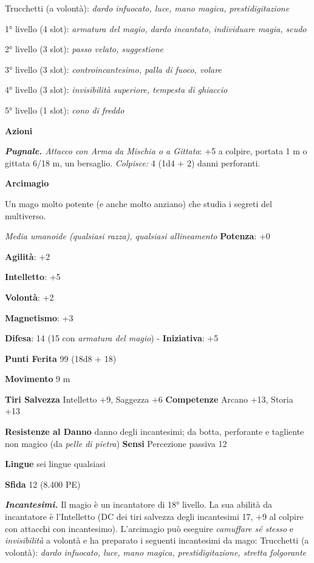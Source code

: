 \begin{multicols}{2}
Trucchetti (a volontà): \emph{dardo infuocato, luce, mano magica,}
\emph{prestidigitazione}

1° livello (4 slot): \emph{armatura del magio, dardo incantato,}
\emph{individuare magia, scudo}

2° livello (3 slot): \emph{passo velato, suggestione}

3° livello (3 slot): \emph{controincantesimo, palla di fuoco, volare}

4° livello (3 slot): \emph{invisibilità superiore, tempesta di ghiaccio}

5° livello (1 slot): \emph{cono di freddo}

\smallskip\textbf{Azioni}

\emph{\textbf{Pugnale.} Attacco con Arma da Mischia o a Gittata}: +5 a
colpire, portata 1 m o gittata 6/18 m, un bersaglio. \emph{Colpisce:}
4 (1d4 + 2) danni perforanti.




\textbf{Arcimagio}

Un mago molto potente (e anche molto anziano) che studia i segreti del
multiverso.

\emph{Media umanoide (qualsiasi razza), qualsiasi allineamento}
\textbf{Potenza}: +0

\textbf{Agilità}: +2

\textbf{Intelletto}: +5

\textbf{Volontà}: +2

\textbf{Magnetismo}: +3

\textbf{Difesa}: 14 (15 con \emph{armatura del magio}) - \textbf{Iniziativa}: +5

\textbf{Punti Ferita} 99 (18d8 + 18)

\textbf{Movimento} 9 m

\textbf{Tiri Salvezza} Intelletto +9, Saggezza +6 \textbf{Competenze}
Arcano +13, Storia +13

\textbf{Resistenze al Danno} danno degli incantesimi; da botta,
perforante e tagliente non magico (da \emph{pelle di pietra})
\textbf{Sensi} Percezione passiva 12

\textbf{Lingue} sei lingue qualsiasi

\textbf{Sfida} 12 (8.400 PE)\smallskip

\emph{\textbf{Incantesimi.}} Il magio è un incantatore di 18° livello.
La sua abilità da incantatore è l'Intelletto (DC dei tiri salvezza
degli incantesimi 17, +9 al colpire con attacchi con incantesimo).
L'arcimagio può eseguire \emph{camuffare sé stesso} e
\emph{invisibilità} a volontà e ha preparato i seguenti incantesimi da
mago: Trucchetti (a volontà): \emph{dardo infuocato, luce, mano magica,}
\emph{prestidigitazione, stretta folgorante}


\end{multicols}
